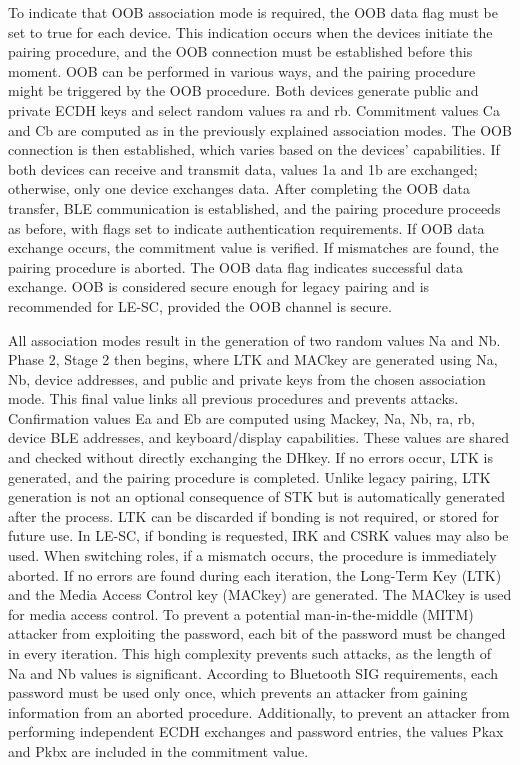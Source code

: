 \documentclass{Configuration_Files/PoliMi3i_thesis}
\begin{document}
To indicate that OOB association mode is required, the OOB data flag must be set to true for each device. This indication occurs when the devices initiate the pairing procedure, and the OOB connection must be established before this moment. OOB can be performed in various ways, and the pairing procedure might be triggered by the OOB procedure. Both devices generate public and private ECDH keys and select random values ra and rb. Commitment values Ca and Cb are computed as in the previously explained association modes. The OOB connection is then established, which varies based on the devices' capabilities. If both devices can receive and transmit data, values 1a and 1b are exchanged; otherwise, only one device exchanges data. After completing the OOB data transfer, BLE communication is established, and the pairing procedure proceeds as before, with flags set to indicate authentication requirements. If OOB data exchange occurs, the commitment value is verified. If mismatches are found, the pairing procedure is aborted. The OOB data flag indicates successful data exchange. OOB is considered secure enough for legacy pairing and is recommended for LE-SC, provided the OOB channel is secure.

All association modes result in the generation of two random values Na and Nb. Phase 2, Stage 2 then begins, where LTK and MACkey are generated using Na, Nb, device addresses, and public and private keys from the chosen association mode. This final value links all previous procedures and prevents attacks. Confirmation values Ea and Eb are computed using Mackey, Na, Nb, ra, rb, device BLE addresses, and keyboard/display capabilities. These values are shared and checked without directly exchanging the DHkey. If no errors occur, LTK is generated, and the pairing procedure is completed. Unlike legacy pairing, LTK generation is not an optional consequence of STK but is automatically generated after the process. LTK can be discarded if bonding is not required, or stored for future use. In LE-SC, if bonding is requested, IRK and CSRK values may also be used.
When switching roles, if a mismatch occurs, the procedure is immediately aborted. If no errors are found during each iteration, the Long-Term Key (LTK) and the Media Access Control key (MACkey) are generated. The MACkey is used for media access control. To prevent a potential man-in-the-middle (MITM) attacker from exploiting the password, each bit of the password must be changed in every iteration. This high complexity prevents such attacks, as the length of Na and Nb values is significant. According to Bluetooth SIG requirements, each password must be used only once, which prevents an attacker from gaining information from an aborted procedure. Additionally, to prevent an attacker from performing independent ECDH exchanges and password entries, the values Pkax and Pkbx are included in the commitment value.
\end{document}
